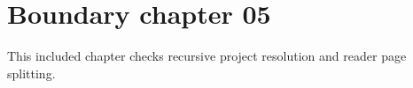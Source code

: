 \section{Boundary chapter 05}
\label{sec:boundary-05}
This included chapter checks recursive project resolution and reader page splitting.
